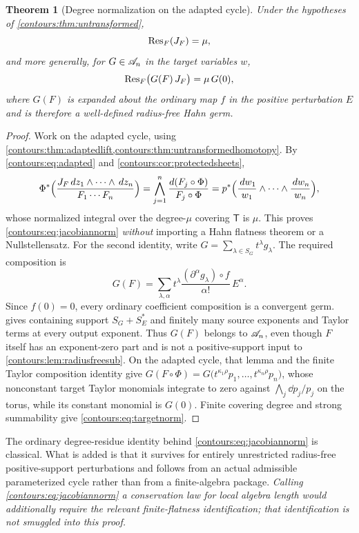 \documentclass[11pt,letterpaper]{article}
\newtheorem{theorem}{Theorem}[section]
\theoremstyle{definition}
\theoremstyle{remark}
\numberwithin{equation}{section}
\begin{document}
\begin{theorem}[Degree normalization on the adapted cycle]
\label{contours:thm:degreenormalization}
Under the hypotheses of \cref{contours:thm:untransformed},
\begin{equation}\label{contours:eq:jacobiannorm}
  \operatorname{Res}_F(J_F)=\mu ,
\end{equation}
and more generally, for $G\in\mathscr A_n$ in the target variables $w$,
\begin{equation}\label{contours:eq:targetnorm}
  \operatorname{Res}_F\bigl(G(F)\,J_F\bigr)=\mu\,G(0),
\end{equation}
where $G(F)$ is expanded about the ordinary map $f$ in the positive perturbation
$E$ and is therefore a well-defined radius-free Hahn germ.
\end{theorem}
\begin{proof}
Work on the adapted cycle, using
\cref{contours:thm:adaptedlift,contours:thm:untransformedhomotopy}. By
\eqref{contours:eq:adapted} and \cref{contours:cor:protectedsheets},
\[
  \Phi^*\Bigl(\frac{J_F\,d z_1\wedge\cdots\wedge \,d z_n}{F_1\cdots F_n}\Bigr)
  =\bigwedge_{j=1}^n\frac{d(F_j\circ\Phi)}{F_j\circ\Phi}
  =p^*\Bigl(\frac{\,d w_1}{w_1}\wedge\cdots\wedge\frac{\,d w_n}{w_n}\Bigr),
\]
whose normalized integral over the degree-$\mu$ covering $\mathsf T$ is $\mu$.
This proves \eqref{contours:eq:jacobiannorm} \emph{without} importing a Hahn
flatness theorem or a Nullstellensatz. For the second identity, write
$G=\sum_{\lambda\in S_G}t^\lambda g_\lambda$. The required composition is
\[
  G(F)=\sum_{\lambda,\alpha}
  t^\lambda\frac{(\partial^\alpha g_\lambda)\circ f}{\alpha!}\,E^\alpha.
\]
Since $f(0)=0$, every ordinary coefficient composition is a convergent germ.
 gives containing support $S_G+S_E^*$ and finitely
many source exponents and Taylor terms at every output exponent. Thus $G(F)$
belongs to $\mathscr A_n$, even though $F$ itself has an exponent-zero part and is not
a positive-support input to \cref{contours:lem:radiusfreesub}. On the adapted cycle,
that lemma and the finite Taylor composition identity give
$G(F\circ\Phi)=G\bigl(t^{\kappa_1\rho}p_1,\ldots,t^{\kappa_n\rho}p_n\bigr)$,
whose nonconstant target Taylor monomials integrate to zero against
$\bigwedge_j\dd p_j/p_j$ on the torus, while its constant monomial is $G(0)$.
Finite covering degree and strong summability give
\eqref{contours:eq:targetnorm}.
\end{proof}

The ordinary degree-residue identity behind \eqref{contours:eq:jacobiannorm} is
classical. What is added is that it survives for entirely unrestricted
radius-free positive-support perturbations and follows from an actual admissible
parameterized cycle rather than from a finite-algebra package. \emph{Calling
\eqref{contours:eq:jacobiannorm} a conservation law for local algebra length
would additionally require the relevant finite-flatness identification; that
identification is not smuggled into this proof.}
\end{document}
